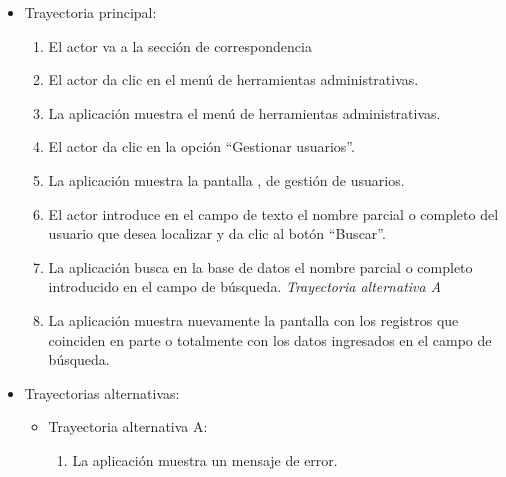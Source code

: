 			\begin{itemize}
				\item Trayectoria principal:
					\begin{enumerate}
						\item El actor va a la sección de correspondencia 
						\item El actor da clic en el menú de herramientas administrativas.
						\item La aplicación muestra el menú de herramientas administrativas.
						\item El actor da clic en la opción ``Gestionar usuarios''.
						\item La aplicación muestra la pantalla , de gestión de usuarios.
						\item El actor introduce en el campo de texto el nombre parcial o completo del usuario que desea localizar y da clic al botón ``Buscar''. 
						\item La aplicación busca en la base de datos el nombre parcial o completo introducido en el campo de búsqueda. \textsl{Trayectoria alternativa A}
						\item La aplicación muestra nuevamente la pantalla  con los registros que coinciden en parte o totalmente con los datos ingresados en el campo de búsqueda.

					\end{enumerate}
				\item Trayectorias alternativas:
					\begin{itemize}
						\item Trayectoria alternativa A:
							\begin{enumerate}
								\item La aplicación muestra un mensaje de error.
							\end{enumerate}
					\end{itemize}
			\end{itemize}
			
